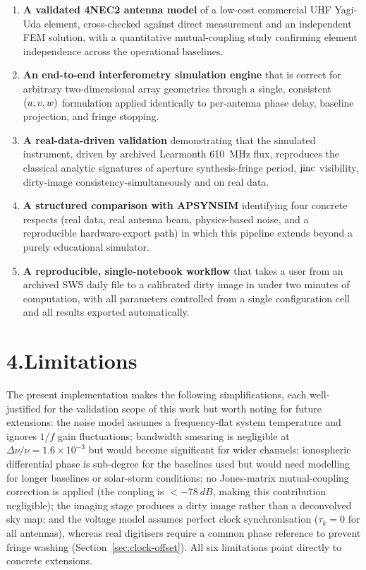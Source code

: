 \begin{enumerate}[leftmargin=1.8em]
  \item \textbf{A validated 4NEC2 antenna model} of a low-cost commercial UHF
        Yagi-Uda element, cross-checked against direct measurement and an independent
        FEM solution, with a quantitative mutual-coupling study confirming element
        independence across the operational baselines.
  \item \textbf{An end-to-end interferometry simulation engine} that is correct for
        arbitrary two-dimensional array geometries through a single, consistent $(u,v,w)$
        formulation applied identically to per-antenna phase delay, baseline projection,
        and fringe stopping.
  \item \textbf{A real-data-driven validation} demonstrating that the simulated
        instrument, driven by archived Learmonth \SI{610}{\mega\hertz} flux, reproduces
        the classical analytic signatures of aperture synthesis-fringe period, $\operatorname{jinc}$
        visibility, dirty-image consistency-simultaneously and on real data.
  \item \textbf{A structured comparison with \textsc{APSYNSIM}} identifying four concrete
        respects (real data, real antenna beam, physics-based noise, and a reproducible
        hardware-export path) in which this pipeline extends beyond a purely
        educational simulator.
  \item \textbf{A reproducible, single-notebook workflow} that takes a user from an
        archived SWS daily file to a calibrated dirty image in under two minutes of
        computation, with all parameters controlled from a single configuration cell
        and all results exported automatically.
\end{enumerate}

\section*{4.\quad Limitations}

The present implementation makes the following simplifications, each well-justified
for the validation scope of this work but worth noting for future extensions:
the noise model assumes a frequency-flat system temperature and ignores $1/f$ gain
fluctuations; bandwidth smearing is negligible at $\Delta\nu/\nu=1.6\times10^{-3}$
but would become significant for wider channels; ionospheric differential phase is
sub-degree for the baselines used but would need modelling for longer baselines or
solar-storm conditions; no Jones-matrix mutual-coupling correction is applied (the
coupling is $<-78~\si{dB}$, making this contribution negligible); the imaging
stage produces a dirty image rather than a deconvolved sky map; and the voltage
model assumes perfect clock synchronisation ($\tau_k=0$ for all antennas), whereas
real digitisers require a common phase reference to prevent fringe washing
(Section~\ref{sec:clock-offset}). All six limitations point directly to concrete
extensions.

